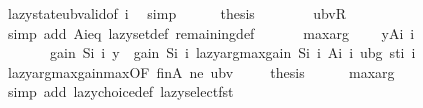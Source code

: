 \begin{isabellebody}
\ lazy{\isacharunderscore}{\kern0pt}state{\isacharunderscore}{\kern0pt}ub{\isacharunderscore}{\kern0pt}valid{\isacharbrackleft}{\kern0pt}of\ i{\isacharbrackright}{\kern0pt}\ \isamarkupfalse%
\ simp\isanewline
\ \ \ \ \isamarkupfalse%
\ {\isacharquery}{\kern0pt}thesis\isanewline
\ \ \ \ \ \ \isamarkupfalse%
\ ubvR\isanewline
\ \ \ \ \ \ \isamarkupfalse%
\ {\isacharparenleft}{\kern0pt}simp\ add{\isacharcolon}{\kern0pt}\ A{\isacharunderscore}{\kern0pt}i{\isacharunderscore}{\kern0pt}eq\ lazy{\isacharunderscore}{\kern0pt}set{\isacharunderscore}{\kern0pt}def\ remaining{\isacharunderscore}{\kern0pt}def{\isacharparenright}{\kern0pt}\isanewline
\ \ \isamarkupfalse%
\isanewline
\isanewline
\ \ \isamarkupfalse%
\ max{\isacharunderscore}{\kern0pt}arg{\isacharcolon}{\kern0pt}\isanewline
\ \ \ \ {\isachardoublequoteopen}{\isasymforall}y{\isasymin}A{\isacharunderscore}{\kern0pt}i\ i{\isachardot}{\kern0pt}\isanewline
\ \ \ \ \ \ \ gain\ {\isacharparenleft}{\kern0pt}S{\isacharunderscore}{\kern0pt}i\ i{\isacharparenright}{\kern0pt}\ y\ {\isasymle}\ gain\ {\isacharparenleft}{\kern0pt}S{\isacharunderscore}{\kern0pt}i\ i{\isacharparenright}{\kern0pt}\ {\isacharparenleft}{\kern0pt}lazy{\isacharunderscore}{\kern0pt}argmax{\isacharunderscore}{\kern0pt}gain\ {\isacharparenleft}{\kern0pt}S{\isacharunderscore}{\kern0pt}i\ i{\isacharparenright}{\kern0pt}\ {\isacharparenleft}{\kern0pt}A{\isacharunderscore}{\kern0pt}i\ i{\isacharparenright}{\kern0pt}\ {\isacharparenleft}{\kern0pt}ubg\ {\isacharparenleft}{\kern0pt}st{\isacharunderscore}{\kern0pt}i\ i{\isacharparenright}{\kern0pt}{\isacharparenright}{\kern0pt}{\isacharparenright}{\kern0pt}{\isachardoublequoteclose}\isanewline
\ \ \ \ \isamarkupfalse%
\ lazy{\isacharunderscore}{\kern0pt}argmax{\isacharunderscore}{\kern0pt}gain{\isacharunderscore}{\kern0pt}max{\isacharbrackleft}{\kern0pt}OF\ finA\ ne\ ubv{\isacharbrackright}{\kern0pt}\ \isakeywordONE{{\isachardot}{\kern0pt}}\isamarkupfalse%
\isanewline
\isanewline
\ \ \isamarkupfalse%
\ {\isacharquery}{\kern0pt}thesis\isanewline
\ \ \ \ \isamarkupfalse%
\ max{\isacharunderscore}{\kern0pt}arg\isanewline
\ \ \ \ \isamarkupfalse%
\ {\isacharparenleft}{\kern0pt}simp\ add{\isacharcolon}{\kern0pt}\ lazy{\isacharunderscore}{\kern0pt}choice{\isacharunderscore}{\kern0pt}def\ lazy{\isacharunderscore}{\kern0pt}select{\isacharunderscore}{\kern0pt}fst{\isacharparenright}{\kern0pt}\isanewline
{}\isamarkupfalse%

\end{isabellebody}
